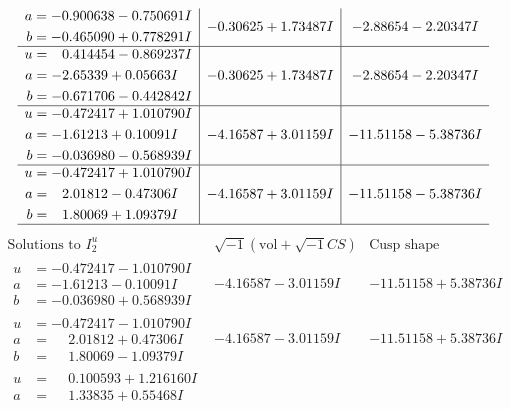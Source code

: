 \documentclass[1p]{elsarticle_modified}
\theoremstyle{definition}
\newcommand{\I}{\sqrt{-1}}
\begin{document}
$$\begin{array}{c|c|c}
\begin{aligned}
a &= -0.900638 - 0.750691 I \\
b &= -0.465090 + 0.778291 I\end{aligned}
 & -0.30625 + 1.73487 I & -2.88654 - 2.20347 I \\ \hline\begin{aligned}
u &= \phantom{-}0.414454 - 0.869237 I \\
a &= -2.65339 + 0.05663 I \\
b &= -0.671706 - 0.442842 I\end{aligned}
 & -0.30625 + 1.73487 I & -2.88654 - 2.20347 I \\ \hline\begin{aligned}
u &= -0.472417 + 1.010790 I \\
a &= -1.61213 + 0.10091 I \\
b &= -0.036980 - 0.568939 I\end{aligned}
 & -4.16587 + 3.01159 I & -11.51158 - 5.38736 I \\ \hline\begin{aligned}
u &= -0.472417 + 1.010790 I \\
a &= \phantom{-}2.01812 - 0.47306 I \\
b &= \phantom{-}1.80069 + 1.09379 I\end{aligned}
 & -4.16587 + 3.01159 I & -11.51158 - 5.38736 I\\
 \hline 
 \end{array}$$\newpage$$\begin{array}{c|c|c}  
\text{Solutions to }I^u_{2}& \I (\text{vol} + \sqrt{-1}CS) & \text{Cusp shape}\\
 \hline 
\begin{aligned}
u &= -0.472417 - 1.010790 I \\
a &= -1.61213 - 0.10091 I \\
b &= -0.036980 + 0.568939 I\end{aligned}
 & -4.16587 - 3.01159 I & -11.51158 + 5.38736 I \\ \hline\begin{aligned}
u &= -0.472417 - 1.010790 I \\
a &= \phantom{-}2.01812 + 0.47306 I \\
b &= \phantom{-}1.80069 - 1.09379 I\end{aligned}
 & -4.16587 - 3.01159 I & -11.51158 + 5.38736 I \\ \hline\begin{aligned}
u &= \phantom{-}0.100593 + 1.216160 I \\
a &= \phantom{-}1.33835 + 0.55468 I \\

\end{aligned}
\end{array}$$
\end{document}
